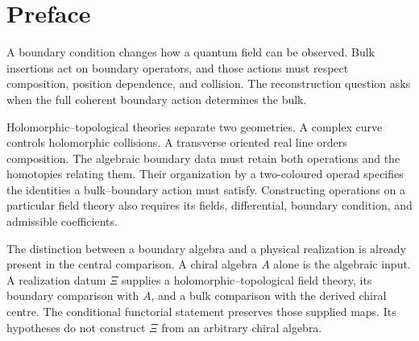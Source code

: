 \providecommand{\cL}{\mathscr{L}}
\providecommand{\Steinb}{\mathfrak{S}}
\providecommand{\cZ}{\mathcal{Z}}
\providecommand{\cH}{\mathcal{H}}
\providecommand{\fg}{\mathfrak{g}}
\providecommand{\cW}{\mathcal{W}}
\providecommand{\gSC}{\mathfrak{g}^{\mathrm{SC}}}
\providecommand{\gAmod}{\mathfrak{g}^{\mathrm{mod}}_\cA}
\providecommand{\Ydg}{Y^{\mathrm{dg}}}
\providecommand{\Zder}{\operatorname{Z}_{\mathrm{der}}}
\providecommand{\Abulk}{A_{\mathrm{bulk}}}
\providecommand{\Bbound}{B_{\partial}}
\providecommand{\mc}{\operatorname{MC}}
\providecommand{\Res}{\operatorname{Res}}
\providecommand{\RHom}{\operatorname{RHom}}
\providecommand{\PhiFA}{\Phi^{\mathrm{FA}}}
\providecommand{\SpCh}{\mathrm{Sp}_{\mathrm{Ch}}}
\providecommand{\HolFA}{\mathrm{HolFA}}
\providecommand{\EdHolFA}{E_d\text{-}\HolFA}
\providecommand{\EnHolFA}{E_n\text{-}\HolFA}
\providecommand{\intSigma}{\textstyle\int_{\Sigma}}
\providecommand{\hCS}{\mathrm{hCS}}
\providecommand{\Phihol}{\Phi_{\mathrm{hol}}}

\chapter*{Preface}

A boundary condition changes how a quantum field can be observed.
Bulk insertions act on boundary operators, and those actions must respect
composition, position dependence, and collision. The reconstruction
question asks when the full coherent boundary action determines the bulk.

Holomorphic--topological theories separate two geometries. A complex curve
controls holomorphic collisions. A transverse oriented real line orders
composition. The algebraic boundary data must retain both operations and
the homotopies relating them. Their organization by a two-coloured operad
specifies the identities a bulk--boundary action must satisfy.
Constructing operations on a particular field theory also requires its
fields, differential, boundary condition, and admissible coefficients.

The distinction between a boundary algebra and a physical realization is
already present in the central comparison. A chiral algebra $A$ alone
is the algebraic input. A realization datum $\Xi$ supplies a
holomorphic--topological field theory, its boundary comparison with $A$,
and a bulk comparison with the derived chiral centre. The conditional
functorial statement preserves those supplied maps. Its hypotheses do not
construct $\Xi$ from an arbitrary chiral algebra.

